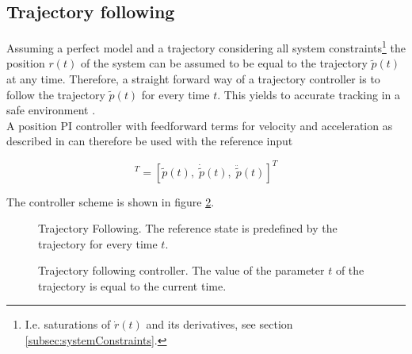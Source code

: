 \subsection{Trajectory following}
Assuming a perfect model and a trajectory considering all system constraints\footnote{I.e. saturations of $\dot{r}(t)$ and its derivatives, see section \ref{subsec:systemConstraints}.} the position $r\left(t\right)$ of the system can be assumed to be equal to the trajectory $\tilde{p}(t)$ at any time. Therefore, a straight forward way of a trajectory controller is to follow the trajectory $\tilde{p}(t)$ for every time $t$. This yields to accurate tracking in a safe environment \cite{doessegger}.
\\
A position PI controller with feedforward terms for velocity and acceleration as described in \cite{meiermueri} can therefore be used with the reference input

\begin{equation}
  [r_{ref}(t), \; \dot{r}_{ref}(t), \; \ddot{r}_{ref}(t)]^T = [\tilde{p}(t), \; \dot{\tilde{p}}(t), \; \ddot{\tilde{p}}(t)]^T
\end{equation}

The controller scheme is shown in figure \ref{fig:trajectoryfollowing}. 

\begin{figure}[H]
    \centering
    \def\svgwidth{0.4\columnwidth}
    
    \caption{Trajectory Following. The reference state is predefined by the trajectory for every time $t$.}
    \label{fig:scene_trajectoryFollowing}
\end{figure}

\begin{figure}[H]
    \centering
    \def\svgwidth{\columnwidth}
    
    \caption{Trajectory following controller. The value of the parameter $t$ of the trajectory is equal to the current time.}
    \label{fig:trajectoryfollowing}
\end{figure}


